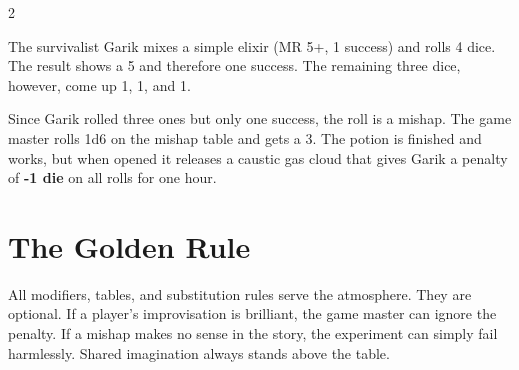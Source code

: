 \begin{multicols}{2}
\begin{pexample}[Example]
The survivalist Garik mixes a simple elixir (MR 5+, 1 success) and rolls 4 dice. The result shows a 5 and therefore one success. The remaining three dice, however, come up 1, 1, and 1.

Since Garik rolled three ones but only one success, the roll is a mishap. The game master rolls 1d6 on the mishap table and gets a 3. The potion is finished and works, but when opened it releases a caustic gas cloud that gives Garik a penalty of \textbf{-1 die} on all rolls for one hour.
\end{pexample}

\section{The Golden Rule}

All modifiers, tables, and substitution rules serve the atmosphere. They are optional. If a player's improvisation is brilliant, the game master can ignore the penalty. If a mishap makes no sense in the story, the experiment can simply fail harmlessly. Shared imagination always stands above the table.

\end{multicols}
